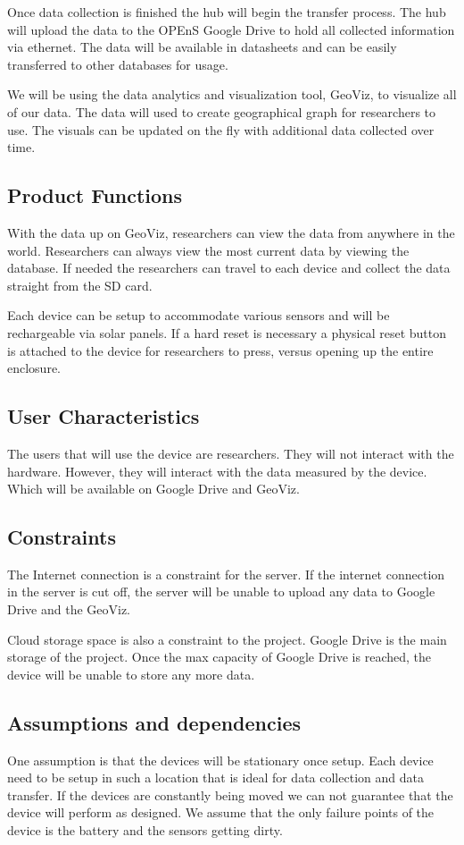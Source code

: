 \documentclass[onecolumn, draftclsnofoot,10pt, compsoc]{IEEEtran}
\begin{document}
Once data collection is finished the hub will begin the transfer process.  The hub will upload the data to the OPEnS Google Drive to hold all collected information via ethernet.  The data will be available in datasheets and can be easily transferred to other databases for usage.
\newline

We will be using the data analytics and visualization tool, GeoViz, to visualize all of our data.  The data will used to create geographical graph for researchers to use.  The visuals can be updated on the fly with additional data collected over time.
\subsection{Product Functions}
With the data up on GeoViz, researchers can view the data from anywhere in the world.  Researchers can always view the most current data by viewing the database.  If needed the researchers can travel to each device and collect the data straight from the SD card.


Each device can be setup to accommodate various sensors and will be rechargeable via solar panels.  If a hard reset is necessary a physical reset button is attached to the device for researchers to press, versus opening up the entire enclosure.
\subsection{User Characteristics}
The users that will use the device are researchers. They will not interact with the hardware. However, they will interact with the data measured by the device. Which will be available on Google Drive and GeoViz.
\subsection{Constraints}
The Internet connection is a constraint for the server. If the internet connection in the server is cut off, the server will be unable to upload any data to Google Drive and the GeoViz.


Cloud storage space is also a constraint to the project. Google Drive is the main storage of the project. Once the max capacity of Google Drive is reached, the device will be unable to store any more data. 
\subsection {Assumptions and dependencies}
One assumption is that the devices will be stationary once setup.  Each device need to be setup in such a location that is ideal for data collection and data transfer.  If the devices are constantly being moved we can not guarantee that the device will perform as designed.  We assume that the only failure points of the device is the battery and the sensors getting dirty.
\end{document}
